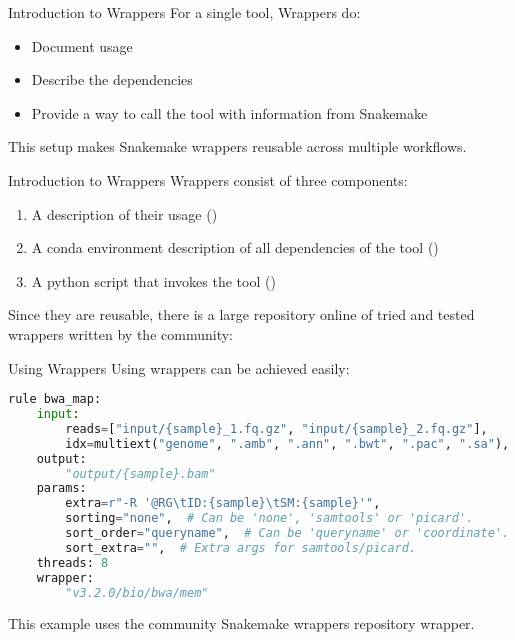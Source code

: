 \begin{frame}{Introduction to Wrappers}
    For a single tool, \Snakemake{} Wrappers do:
    \begin{itemize}[<+->]
        \item Document usage
        \item Describe the dependencies
        \item Provide a way to call the tool with information from Snakemake
    \end{itemize}
    This setup makes Snakemake wrappers reusable across multiple workflows.
\end{frame}

\begin{frame}{Introduction to Wrappers}
    Wrappers consist of three components:
    \begin{enumerate}
        \item A description of their usage ()
        \item A conda environment description of all dependencies of the tool ()
        \item A python script that invokes the tool ()
    \end{enumerate}
    Since they are reusable, there is a large repository online of tried and tested 
    wrappers written by the community: 
\end{frame}

\begin{frame}[fragile]{Using Wrappers}
    Using \Snakemake{} wrappers can be achieved easily:
    \begin{lstlisting}[language=Python,style=Python]
rule bwa_map:
    input:
        reads=["input/{sample}_1.fq.gz", "input/{sample}_2.fq.gz"],
        idx=multiext("genome", ".amb", ".ann", ".bwt", ".pac", ".sa"),
    output:
        "output/{sample}.bam"
    params:
        extra=r"-R '@RG\tID:{sample}\tSM:{sample}'",
        sorting="none",  # Can be 'none', 'samtools' or 'picard'.
        sort_order="queryname",  # Can be 'queryname' or 'coordinate'.
        sort_extra="",  # Extra args for samtools/picard.
    threads: 8
    wrapper:
        "v3.2.0/bio/bwa/mem"
    \end{lstlisting}
    \begin{docs}
        This example uses the community Snakemake wrappers repository  wrapper.
    \end{docs}
\end{frame}

